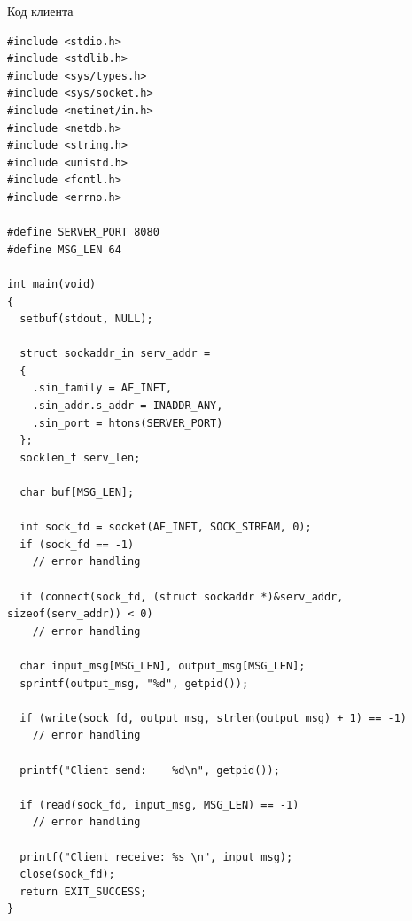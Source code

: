Код клиента
\begin{lstlisting}
#include <stdio.h>
#include <stdlib.h>
#include <sys/types.h>
#include <sys/socket.h>
#include <netinet/in.h>
#include <netdb.h>
#include <string.h>
#include <unistd.h>
#include <fcntl.h>
#include <errno.h>

#define SERVER_PORT 8080
#define MSG_LEN 64

int main(void)
{
  setbuf(stdout, NULL);

  struct sockaddr_in serv_addr =
  {
    .sin_family = AF_INET,
    .sin_addr.s_addr = INADDR_ANY,
    .sin_port = htons(SERVER_PORT)
  };
  socklen_t serv_len;

  char buf[MSG_LEN];

  int sock_fd = socket(AF_INET, SOCK_STREAM, 0);
  if (sock_fd == -1)
    // error handling

  if (connect(sock_fd, (struct sockaddr *)&serv_addr, sizeof(serv_addr)) < 0)
    // error handling

  char input_msg[MSG_LEN], output_msg[MSG_LEN];
  sprintf(output_msg, "%d", getpid());

  if (write(sock_fd, output_msg, strlen(output_msg) + 1) == -1)
    // error handling

  printf("Client send:    %d\n", getpid());

  if (read(sock_fd, input_msg, MSG_LEN) == -1)
    // error handling

  printf("Client receive: %s \n", input_msg);
  close(sock_fd);
  return EXIT_SUCCESS;
}
\end{lstlisting}

